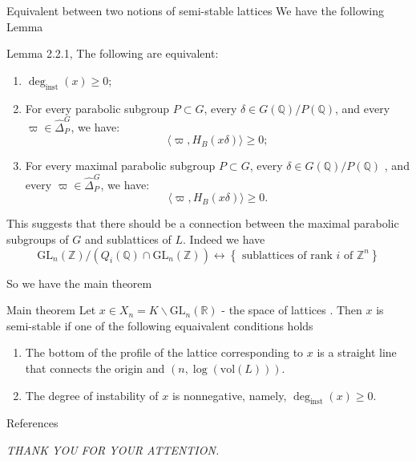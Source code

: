 \documentclass[pdf]{beamer}
\begin{document}
\begin{frame}{Equivalent between two notions of semi-stable lattices}
    We have the following Lemma
    \begin{block}{Lemma 2.2.1, \cite{chaudouard2016variante}}
        The following are equivalent:
        \begin{enumerate}
            \item \(\deg_{\text{inst}}(x) \geq 0\);
            \item For every parabolic subgroup \( P \subset G \), every \( \delta \in G(\mathbb{Q})/P(\mathbb{Q})\), and every \( \varpi \in \hat{\Delta}_P^G \), we have:
                  \[
                      \langle \varpi, H_B(x\delta ) \rangle \geq 0;
                  \]
            \item For every maximal parabolic subgroup \( P \subset G \), every \( \delta \in  G(\mathbb{Q})/P(\mathbb{Q})\) , and every \( \varpi \in \hat{\Delta}_P^G \), we have:
                  \[
                      \langle \varpi, H_B(x\delta ) \rangle \geq 0.
                  \]
        \end{enumerate}
    \end{block}
\end{frame}


\begin{frame}
    This suggests that there should be a connection between the maximal parabolic subgroups of $G$
    and sublattices of $L$. Indeed we have
    \[ \text{GL}_n(\mathbb{Z})/(Q_i(\mathbb{Q}) \cap \text{GL}_n(\mathbb{Z})) \longleftrightarrow \left\lbrace \text{ sublattices of rank $i$ of $\mathbb{Z}^n$}\right\rbrace\]

    So we have the main theorem
    \begin{block}{Main theorem}
        Let $x \in X_n = K \backslash \text{GL}_n(\mathbb{R})$ - the space of lattices . Then $x$ is semi-stable if one of the following equaivalent
        conditions holds
        \begin{enumerate}
            \item The bottom of the profile of the lattice corresponding to $x$ is a straight line that connects the origin and $(n,\log(\text{vol}(L)))$.
            \item The degree of instability of $x$ is nonnegative, namely, $\deg_{\text{inst}}(x) \ge 0$.
        \end{enumerate}
    \end{block}

\end{frame}
\begin{frame}{References}

\end{frame}

\begin{frame}
    \begin{center}
        \textit{THANK YOU FOR YOUR ATTENTION.}
    \end{center}
\end{frame}
\end{document}
